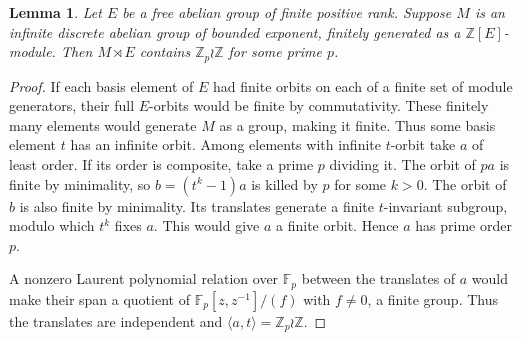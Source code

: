 \documentclass[11pt,a4paper]{article}
\newtheorem{lem}[thm]{Lemma}
\theoremstyle{remark}
\begin{document}
\begin{lem}\label{latticelamps}
Let $E$ be a free abelian group of finite positive rank. Suppose $M$ is
an infinite discrete abelian group of bounded exponent, finitely generated
as a $\mathbb Z[E]$-module. Then $M\rtimes E$ contains $\mathbb Z_p\wr\mathbb Z$
for some prime $p$.
\end{lem}
\begin{proof}
If each basis element of $E$ had finite orbits on each of a finite set
of module generators, their full $E$-orbits would be finite by
commutativity. These finitely many elements would generate $M$ as a
group, making it finite. Thus some basis element $t$ has an infinite
orbit. Among elements with infinite $t$-orbit take $a$ of least order.
If its order is composite, take a prime $p$ dividing it. The orbit of
$pa$ is finite by minimality, so $b=(t^k-1)a$ is killed by $p$ for some
$k>0$. The orbit of $b$ is also finite by minimality. Its translates
generate a finite $t$-invariant subgroup, modulo which $t^k$ fixes $a$.
This would give $a$ a finite orbit. Hence $a$ has prime order $p$.

A nonzero Laurent polynomial relation over $\mathbb F_p$ between the
translates of $a$ would make their span a quotient of
$\mathbb F_p[z,z^{-1}]/(f)$ with $f\ne0$, a finite group. Thus the
translates are independent and $\langle a,t\rangle=\mathbb Z_p\wr\mathbb Z$.
\end{proof}
\end{document}
